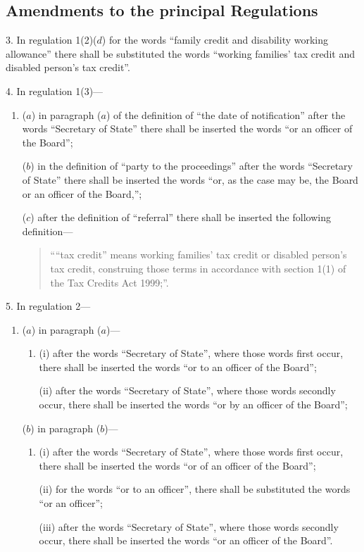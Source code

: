\documentclass[12pt,a4paper]{article}
\begin{document}
\subsection[3--27. Amendments to the principal Regulations]{Amendments to the principal Regulations}

3.  In regulation 1(2)($d$)  for the words “family credit and disability working allowance” there shall be substituted the words “working families' tax credit and disabled person’s tax credit”.

\medskip

4.  In regulation 1(3)—
\begin{enumerate}\item[]
($a$) in paragraph ($a$)  of the definition of “the date of notification” after the words “Secretary of State” there shall be inserted the words “or an officer of the Board”;

($b$) in the definition of “party to the proceedings” after the words “Secretary of State” there shall be inserted the words “or, as the case may be, the Board or an officer of the Board,”;

($c$) after the definition of “referral” there shall be inserted the following definition—
\begin{quotation}
““tax credit” means working families' tax credit or disabled person’s tax credit, construing those terms in accordance with section 1(1) of the Tax Credits Act 1999;”.
\end{quotation}
\end{enumerate}

\medskip

5.  In regulation 2—
\begin{enumerate}\item[]
($a$) in paragraph ($a$)—
\begin{enumerate}\item[]
(i) after the words “Secretary of State”, where those words first occur, there shall be inserted the words “or to an officer of the Board”;

(ii) after the words “Secretary of State”, where those words secondly occur, there shall be inserted the words “or by an officer of the Board”;
\end{enumerate}

($b$) in paragraph ($b$)—
\begin{enumerate}\item[]
(i) after the words “Secretary of State”, where those words first occur, there shall be inserted the words “or of an officer of the Board”;

(ii) for the words “or to an officer”, there shall be substituted the words “or an officer”;

(iii) after the words “Secretary of State”, where those words secondly occur, there shall be inserted the words “or an officer of the Board”.
\end{enumerate}
\end{enumerate}
\end{document}
